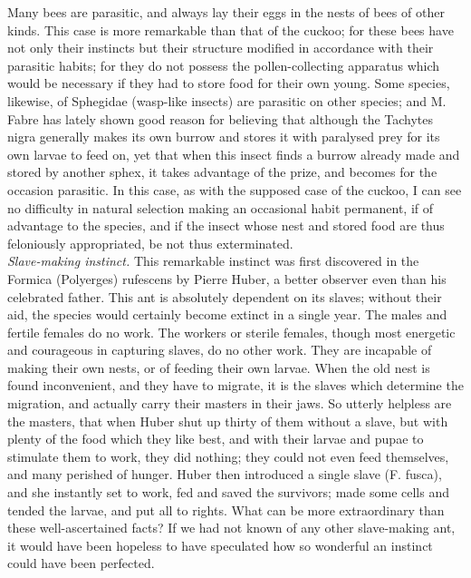 \indent Many bees are parasitic, and always lay their eggs in the nests of bees of other kinds. This case is more remarkable than that of the cuckoo; for these bees have not only their instincts but their structure modified in accordance with their parasitic habits; for they do not possess the pollen-collecting apparatus which would be necessary if they had to store food for their own young. Some species, likewise, of Sphegidae (wasp-like insects) are parasitic on other species; and M. Fabre has lately shown good reason for believing that although the Tachytes nigra generally makes its own burrow and stores it with paralysed prey for its own larvae to feed on, yet that when this insect finds a burrow already made and stored by another sphex, it takes advantage of the prize, and becomes for the occasion parasitic. In this case, as with the supposed case of the cuckoo, I can see no difficulty in natural selection making an occasional habit permanent, if of advantage to the species, and if the insect whose nest and stored food are thus feloniously appropriated, be not thus exterminated.\\
\indent \emph{Slave-making instinct.} This remarkable instinct was first discovered in the Formica (Polyerges) rufescens by Pierre Huber, a better observer even than his celebrated father. This ant is absolutely dependent on its slaves; without their aid, the species would certainly become extinct in a single year. The males and fertile females do no work. The workers or sterile females, though most energetic and courageous in capturing slaves, do no other work. They are incapable of making their own nests, or of feeding their own larvae. When the old nest is found inconvenient, and they have to migrate, it is the slaves which determine the migration, and actually carry their masters in their jaws. So utterly helpless are the masters, that when Huber shut up thirty of them without a slave, but with plenty of the food which they like best, and with their larvae and pupae to stimulate them to work, they did nothing; they could not even feed themselves, and many perished of hunger. Huber then introduced a single slave (F. fusca), and she instantly set to work, fed and saved the survivors; made some cells and tended the larvae, and put all to rights. What can be more extraordinary than these well-ascertained facts? If we had not known of any other slave-making ant, it would have been hopeless to have speculated how so wonderful an instinct could have been perfected.\\
